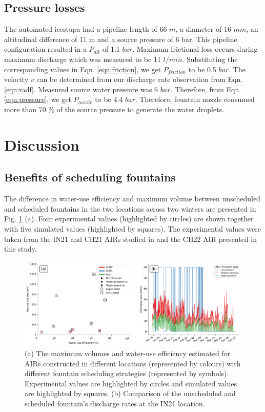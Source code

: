 \documentclass[tc, manuscript]{copernicus}
\begin{document}
\subsection{Pressure losses}

The automated icestupa had a pipeline length of 66 $m$, a diameter of 16 $mm$, an altitudinal difference of 11 m
and a source pressure of 6 bar. This pipeline configuration resulted in a $P_{alt}$ of 1.1 $bar$. Maximum
frictional loss occurs during maximum discharge which was measured to be 11 $l/min$. Substituting the
corresponding values in Eqn. \ref{eqn:friction}, we get $P_{friction}$ to be 0.5 $bar$. The velocity $v$ can be
determined from our discharge rate observation from Eqn. \ref{eqn:radf}. Measured source water pressure was 6
$bar$. Therefore, from Eqn. \ref{eqn:pressure}, we get $P_{nozzle}$ to be 4.4 $bar$. Therefore, fountain nozzle
consumed more than 70 \% of the source pressure to generate the water droplets. 

\section{Discussion}

\subsection{Benefits of scheduling fountains}

The difference in water-use efficiency and maximum volume between unscheduled and scheduled fountains in the two
locations across two winters are presented in Fig. \ref{fig:wue} (a). Four experimental values (highlighted by
circles) are shown together with five simulated values (highlighted by squares).  The experimental values were
taken from the IN21 and CH21 AIRs studied in \citet{balasubramanianInfluenceMeteorologicalConditions2022} and
the CH22 AIR presented in this study. 

\begin{figure}[t]
\includegraphics[width=\textwidth]{Figures/wue.png}

\caption{(a) The maximum volumes and water-use efficiency estimated for AIRs constructed in different locations
(represented by colours) with different fountain scheduling strategies (represented by symbols). Experimental
values are highlighted by circles and simulated values are highlighted by squares. (b) Comparison of
the unscheduled and scheduled fountain's discharge rates at the IN21 location.}

\label{fig:wue}
\end{figure}
\end{document}
